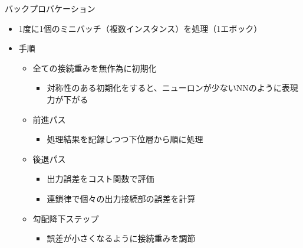 \documentclass[aspectratio=169, dvipdfmx, 14pt, xcolor={svgnames,dvipsnames}]{beamer}
\def\tightlist{\itemsep1pt\parskip0pt\parsep0pt}
\begin{document}

\begin{frame}{\quad バックプロバケーション}
  \begin{itemize}
    \item
          1度に1個の\alert{ミニバッチ}（複数インスタンス）を処理（\alert{1エポック}）
    \item
          手順

          \begin{itemize}
            \tightlist
            \item
                  全ての接続重みを無作為に初期化

                  \begin{itemize}
                    \tightlist
                    \item
                          対称性のある初期化をすると、ニューロンが少ないNNのように表現力が下がる
                  \end{itemize}
            \item
                  前進パス

                  \begin{itemize}
                    \tightlist
                    \item
                          処理結果を記録しつつ下位層から順に処理
                  \end{itemize}
            \item
                  後退パス

                  \begin{itemize}
                    \tightlist
                    \item
                          出力誤差をコスト関数で評価
                    \item
                          連鎖律で個々の出力接続部の誤差を計算
                  \end{itemize}
            \item
                  勾配降下ステップ

                  \begin{itemize}
                    \tightlist
                    \item
                          誤差が小さくなるように接続重みを調節
                  \end{itemize}
          \end{itemize}
  \end{itemize}
\end{frame}
\end{document}
